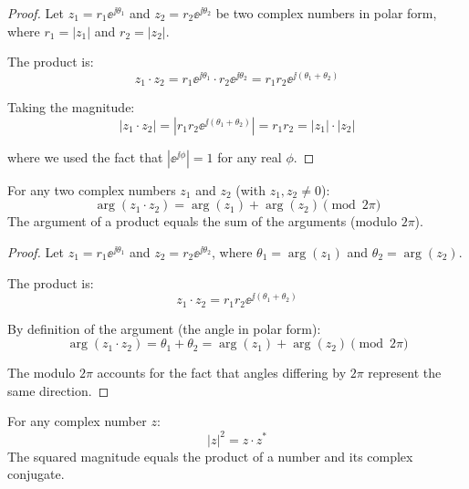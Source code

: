 \begin{proof}
Let $z_1 = r_1 \ee^{\jj\theta_1}$ and $z_2 = r_2 \ee^{\jj\theta_2}$ be two complex numbers in polar form, where $r_1 = |z_1|$ and $r_2 = |z_2|$.

The product is:
\begin{equation*}
z_1 \cdot z_2 = r_1 \ee^{\jj\theta_1} \cdot r_2 \ee^{\jj\theta_2} = r_1 r_2 \ee^{\jj(\theta_1 + \theta_2)}
\end{equation*}

Taking the magnitude:
\begin{equation*}
|z_1 \cdot z_2| = |r_1 r_2 \ee^{\jj(\theta_1 + \theta_2)}| = r_1 r_2 = |z_1| \cdot |z_2|
\end{equation*}

where we used the fact that $|\ee^{\jj\phi}| = 1$ for any real $\phi$.
\end{proof}

\begin{keyconceptbox}[title=Key Property: Argument of a Product]
For any two complex numbers $z_1$ and $z_2$ (with $z_1, z_2 \neq 0$):
\begin{equation}
\arg(z_1 \cdot z_2) = \arg(z_1) + \arg(z_2) \pmod{2\pi}
\end{equation}
The argument of a product equals the sum of the arguments (modulo $2\pi$).
\end{keyconceptbox}

\begin{proof}
Let $z_1 = r_1 \ee^{\jj\theta_1}$ and $z_2 = r_2 \ee^{\jj\theta_2}$, where $\theta_1 = \arg(z_1)$ and $\theta_2 = \arg(z_2)$.

The product is:
\begin{equation*}
z_1 \cdot z_2 = r_1 r_2 \ee^{\jj(\theta_1 + \theta_2)}
\end{equation*}

By definition of the argument (the angle in polar form):
\begin{equation*}
\arg(z_1 \cdot z_2) = \theta_1 + \theta_2 = \arg(z_1) + \arg(z_2) \pmod{2\pi}
\end{equation*}

The modulo $2\pi$ accounts for the fact that angles differing by $2\pi$ represent the same direction.
\end{proof}

\begin{keyconceptbox}[title=Key Property: Magnitude Squared via Conjugate]
For any complex number $z$:
\begin{equation}
|z|^2 = z \cdot z^*
\end{equation}
The squared magnitude equals the product of a number and its complex conjugate.
\end{keyconceptbox}

